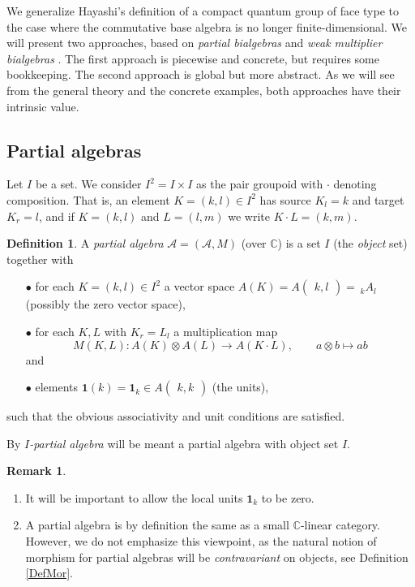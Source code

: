 \documentclass[10pt]{article}
\newcommand{\C}{\mathbb{C}}
\newcommand{\Grs}[3]{#1{\begin{pmatrix} #2,  #3\end{pmatrix}}}
\newcommand{\GrDA}[3]{{}_{\;#2}#1_{#3}} %
\newcommand{\Unit}{\mathbf{1}}
\newcommand{\wmult}{\cdot}
\theoremstyle{definition}
\newtheorem{Def}[Theorem]{Definition}
\newtheorem{Rem}[Theorem]{Remark}
\numberwithin{equation}{section}
\begin{document}
We generalize Hayashi's definition of a compact quantum group of face type \cite{Hay1} to the case where the commutative base algebra is no longer finite-dimensional. We will present two approaches, based on \emph{partial bialgebras} and \emph{weak multiplier bialgebras} \cite{Boh1,VDW1}. The first approach is piecewise and concrete, but requires some bookkeeping. The second approach is global but more abstract. As we will see from the general theory and the concrete examples, both approaches have their intrinsic value.

\subsection{Partial algebras}

Let $I$ be a set. We consider $I^2=I\times I$ as the pair groupoid with $\wmult$ denoting composition. That is, an element $K=(k,l)\in I^2$ has source $K_l = k$ and target $K_r=l$, and if $K=(k,l)$ and $L=(l,m)$ we write $K\wmult L = (k,m)$. 

\begin{Def} A \emph{partial algebra} $\mathscr{A}=(\mathscr{A},M)$ (over $\C$) is a set $I$ (the \emph{object} set) together with 
\begin{itemize}
\item[$\bullet$] for each $K=(k,l)\in I^2$ a vector space $A(K) = \Grs{A}{k}{l}=\!\!\GrDA{A}{k}{l}$ (possibly the zero vector space),
\item[$\bullet$] for each $K,L$ with $K_r = L_l$ a multiplication map \[M(K,L):A(K) \otimes A(L)\rightarrow A(K\cdot L),\qquad a\otimes b \mapsto ab\]  and 
\item[$\bullet$] elements $\Unit(k) = \Unit_k \in \Grs{A}{k}{k}$ (the units), %
\end{itemize}
such that the obvious associativity and unit conditions are satisfied. 

By \emph{$I$-partial algebra} will be meant a partial algebra with object set $I$.
\end{Def}

\begin{Rem}
\begin{enumerate}\item It will be important to allow the local units $\Unit_k$ to be zero.
\item A partial algebra is by definition the same as a small $\C$-linear category. However, we do not emphasize this viewpoint, as the natural notion of morphism for partial algebras will be \emph{contravariant} on objects, see Definition \ref{DefMor}.%
\end{enumerate}
\end{Rem}
\end{document}
